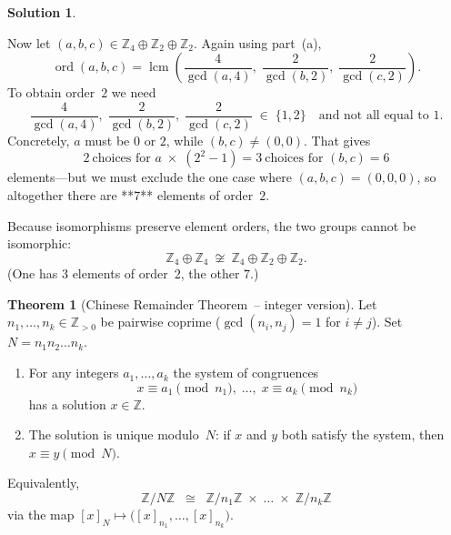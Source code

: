 \documentclass[12pt]{article}
\DeclareMathOperator{\lcm}{lcm}
\DeclareMathOperator{\ord}{ord}
\theoremstyle{definition} %
\newtheorem{solution}{Solution}
\newtheorem{theorem}{Theorem}
\theoremstyle{plain} %
\begin{document}
\begin{solution}
\begin{enumerate}[label=\textbf{(\alph*)}]
      Now let \((a,b,c)\in\mathbb Z_4\oplus\mathbb Z_2\oplus\mathbb Z_2\).
      Again using part (a),
      \[
        \ord(a,b,c)=\lcm\!\left(
          \frac{4}{\gcd(a,4)},\;
          \frac{2}{\gcd(b,2)},\;
          \frac{2}{\gcd(c,2)}
        \right).
      \]
      To obtain order \(2\) we need
      \[
        \frac{4}{\gcd(a,4)},\;
        \frac{2}{\gcd(b,2)},\;
        \frac{2}{\gcd(c,2)}
        \;\in\;\{1,2\}
        \quad\text{and not all equal to }1.
      \]
      Concretely, \(a\) must be \(0\) or \(2\), while
      \((b,c)\neq(0,0)\).
      That gives
      \[
        2\ \text{choices for }a\;\times\;(2^2-1)=3\ \text{choices for }(b,c)
        =6
      \]
      elements—but we must exclude the one case where \((a,b,c)=(0,0,0)\),
      so altogether there are **7** elements of order \(2\).

      Because isomorphisms preserve element orders, the two groups cannot be
      isomorphic:
      \[
        \boxed{
          \mathbb Z_4\oplus\mathbb Z_4
          \ \not\cong\
          \mathbb Z_4\oplus\mathbb Z_2\oplus\mathbb Z_2
        }.
      \]
      (One has \(3\) elements of order \(2\), the other \(7\).)
  \end{enumerate}
\end{solution}
\begin{theorem}[Chinese Remainder Theorem – integer version]
  \label{thm:CRT-integers}
  Let $n_{1},\dots,n_{k}\in\mathbb Z_{>0}$ be pairwise coprime
  ($\gcd(n_{i},n_{j})=1$ for $i\neq j$).
  Set $N=n_{1}n_{2}\dots n_{k}$.
  \begin{enumerate}[label=\textup{(\roman*)}]
    \item For any integers $a_{1},\dots,a_{k}$ the system of congruences
    \[
      x\equiv a_{1}\pmod{n_{1}},\;
      \dots,\;
      x\equiv a_{k}\pmod{n_{k}}
    \]
    has a solution $x\in\mathbb Z$.
    \item The solution is unique modulo $N$:
          if $x$ and $y$ both satisfy the system, then $x\equiv y\pmod{N}$.
  \end{enumerate}
  Equivalently,
  \[
    \boxed{\;
      \mathbb Z/N\mathbb Z
      \;\;\cong\;\;
      \mathbb Z/n_{1}\mathbb Z\;\times\;\dots\;\times\;
      \mathbb Z/n_{k}\mathbb Z
    \;}
  \]
  via the map $[x]_{N}\mapsto\bigl([x]_{n_{1}},\dots,[x]_{n_{k}}\bigr)$.
  \end{theorem}
  
\end{document}

